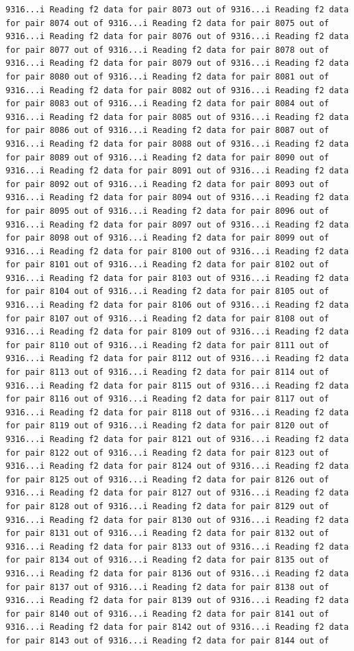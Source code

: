 \documentclass[
]{article}
\begin{document}
\begin{verbatim}
9316...i Reading f2 data for pair 8073 out of 9316...i Reading f2 data for pair 8074 out of 9316...i Reading f2 data for pair 8075 out of 9316...i Reading f2 data for pair 8076 out of 9316...i Reading f2 data for pair 8077 out of 9316...i Reading f2 data for pair 8078 out of 9316...i Reading f2 data for pair 8079 out of 9316...i Reading f2 data for pair 8080 out of 9316...i Reading f2 data for pair 8081 out of 9316...i Reading f2 data for pair 8082 out of 9316...i Reading f2 data for pair 8083 out of 9316...i Reading f2 data for pair 8084 out of 9316...i Reading f2 data for pair 8085 out of 9316...i Reading f2 data for pair 8086 out of 9316...i Reading f2 data for pair 8087 out of 9316...i Reading f2 data for pair 8088 out of 9316...i Reading f2 data for pair 8089 out of 9316...i Reading f2 data for pair 8090 out of 9316...i Reading f2 data for pair 8091 out of 9316...i Reading f2 data for pair 8092 out of 9316...i Reading f2 data for pair 8093 out of 9316...i Reading f2 data for pair 8094 out of 9316...i Reading f2 data for pair 8095 out of 9316...i Reading f2 data for pair 8096 out of 9316...i Reading f2 data for pair 8097 out of 9316...i Reading f2 data for pair 8098 out of 9316...i Reading f2 data for pair 8099 out of 9316...i Reading f2 data for pair 8100 out of 9316...i Reading f2 data for pair 8101 out of 9316...i Reading f2 data for pair 8102 out of 9316...i Reading f2 data for pair 8103 out of 9316...i Reading f2 data for pair 8104 out of 9316...i Reading f2 data for pair 8105 out of 9316...i Reading f2 data for pair 8106 out of 9316...i Reading f2 data for pair 8107 out of 9316...i Reading f2 data for pair 8108 out of 9316...i Reading f2 data for pair 8109 out of 9316...i Reading f2 data for pair 8110 out of 9316...i Reading f2 data for pair 8111 out of 9316...i Reading f2 data for pair 8112 out of 9316...i Reading f2 data for pair 8113 out of 9316...i Reading f2 data for pair 8114 out of 9316...i Reading f2 data for pair 8115 out of 9316...i Reading f2 data for pair 8116 out of 9316...i Reading f2 data for pair 8117 out of 9316...i Reading f2 data for pair 8118 out of 9316...i Reading f2 data for pair 8119 out of 9316...i Reading f2 data for pair 8120 out of 9316...i Reading f2 data for pair 8121 out of 9316...i Reading f2 data for pair 8122 out of 9316...i Reading f2 data for pair 8123 out of 9316...i Reading f2 data for pair 8124 out of 9316...i Reading f2 data for pair 8125 out of 9316...i Reading f2 data for pair 8126 out of 9316...i Reading f2 data for pair 8127 out of 9316...i Reading f2 data for pair 8128 out of 9316...i Reading f2 data for pair 8129 out of 9316...i Reading f2 data for pair 8130 out of 9316...i Reading f2 data for pair 8131 out of 9316...i Reading f2 data for pair 8132 out of 9316...i Reading f2 data for pair 8133 out of 9316...i Reading f2 data for pair 8134 out of 9316...i Reading f2 data for pair 8135 out of 9316...i Reading f2 data for pair 8136 out of 9316...i Reading f2 data for pair 8137 out of 9316...i Reading f2 data for pair 8138 out of 9316...i Reading f2 data for pair 8139 out of 9316...i Reading f2 data for pair 8140 out of 9316...i Reading f2 data for pair 8141 out of 9316...i Reading f2 data for pair 8142 out of 9316...i Reading f2 data for pair 8143 out of 9316...i Reading f2 data for pair 8144 out of 
\end{verbatim}
\end{document}
